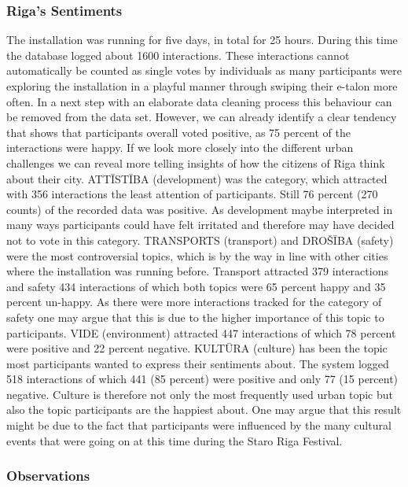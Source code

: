 \subsubsection{Riga’s Sentiments}

The installation was running for five days, in total for 25 hours. During this time the database logged about 1600 interactions.
These interactions cannot automatically be counted as single votes by individuals as many participants were exploring the installation in a playful manner through swiping their e-talon more often.
In a next step with an elaborate data cleaning process this behaviour can be removed from the data set. 
However, we can already identify a clear tendency that shows that participants overall voted positive, as 75 percent of the interactions were happy. 
If we look more closely into the different urban challenges we can reveal more telling insights of how the citizens of Riga think about their city. 
ATTĪSTĪBA (development) was the category, which attracted with 356 interactions the least attention of participants. 
Still 76 percent (270 counts) of the recorded data was positive. 
As development maybe interpreted in many ways participants could have felt irritated and therefore may have decided not to vote in this category. 
TRANSPORTS (transport) and DROŠĪBA (safety) were the most controversial topics, which is by the way in line with other cities where the installation was running before. 
Transport attracted 379 interactions and safety 434 interactions of which both topics were 65 percent happy and 35 percent un-happy. 
As there were more interactions tracked for the category of safety one may argue that this is due to the higher importance of this topic to participants. 
VIDE (environment) attracted 447 interactions of which 78 percent were positive and 22 percent negative. 
KULTŪRA (culture) has been the topic most participants wanted to express their sentiments about. 
The system logged 518 interactions of which 441 (85 percent) were positive and only 77 (15 percent) negative. 
Culture is therefore not only the most frequently used urban topic but also the topic participants are the happiest about. 
One may argue that this result might be due to the fact that participants were influenced by the many cultural events that were going on at this time during the Staro Riga Festival.

\subsubsection{Observations}

